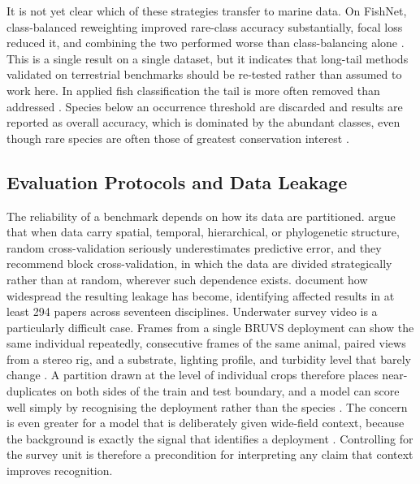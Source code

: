 \documentclass[preprint,12pt]{elsarticle}
\begin{document}
It is not yet clear which of these strategies transfer to marine data.
On FishNet, class-balanced reweighting improved rare-class accuracy
substantially, focal loss reduced it, and combining the two performed
worse than class-balancing alone \citep{ref10}.
This is a single result on a single dataset, but it indicates that
long-tail methods validated on terrestrial benchmarks should be
re-tested rather than assumed to work here. In applied fish
classification the tail is more often removed than addressed
\citep{ref6,ref8}.
Species below an occurrence threshold are discarded and results are
reported as overall accuracy, which is dominated by the abundant
classes, even though rare species are often those of greatest
conservation interest \citep{ref66}.

\subsection{Evaluation Protocols and Data
Leakage}\label{evaluation-protocols-and-data-leakage}

The reliability of a benchmark depends on how its data are partitioned.
\citet{ref17} argue that when data
carry spatial, temporal, hierarchical, or phylogenetic structure, random
cross-validation seriously underestimates predictive error, and they
recommend block cross-validation, in which the data are divided
strategically rather than at random, wherever such dependence exists.
\citet{ref20} document how
widespread the resulting leakage has become, identifying affected
results in at least 294 papers across seventeen disciplines. Underwater
survey video is a particularly difficult case. Frames from a single
BRUVS deployment can show the same individual repeatedly, consecutive
frames of the same animal, paired views from a stereo rig, and a
substrate, lighting profile, and turbidity level that barely change
\citep{ref4,ref19}. A partition drawn at the level of
individual crops therefore places near-duplicates on both sides of the
train and test boundary, and a model can score well simply by
recognising the deployment rather than the species
\citep{ref18,ref58}. The concern is even greater for a
model that is deliberately given wide-field context, because the
background is exactly the signal that identifies a deployment
\citep{ref18,ref58}. Controlling for the survey unit is
therefore a precondition for interpreting any claim that context
improves recognition.
\end{document}
